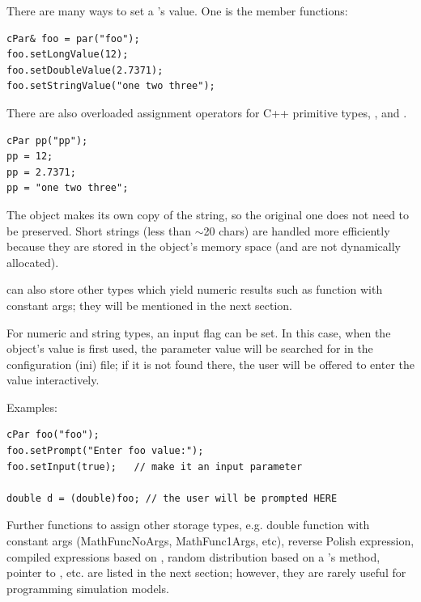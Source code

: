 There are many ways to set a 's value. One is the 
member functions:

\begin{verbatim}
cPar& foo = par("foo");
foo.setLongValue(12);
foo.setDoubleValue(2.7371);
foo.setStringValue("one two three");
\end{verbatim}

There are also overloaded assignment operators for C++ primitive types,
, and .

\begin{verbatim}
cPar pp("pp");
pp = 12;
pp = 2.7371;
pp = "one two three";
\end{verbatim}

The  object makes its own copy of the string, so the
original one does not need to be preserved. Short strings (less than
\ensuremath{\sim}20 chars) are handled more efficiently because they
are stored in the object's memory space (and are not dynamically
allocated).

 can also store other types which yield numeric
results such as function with constant args;
they will be mentioned in the next section.

For numeric and string types, an input flag can be
set. In this case, when the object's value is first used, the
parameter value will be searched for in the configuration (ini)
file; if it is not found there, the user will be offered
to enter the value interactively.

Examples:

\begin{verbatim}
cPar foo("foo");
foo.setPrompt("Enter foo value:");
foo.setInput(true);   // make it an input parameter

double d = (double)foo; // the user will be prompted HERE
\end{verbatim}

Further  functions to assign other storage types,
e.g. double function with constant args (MathFuncNoArgs, MathFunc1Args, etc),
reverse Polish expression, compiled expressions based on
, random distribution based on a
's  method, pointer to ,
etc. are listed in the next section; however, they are rarely useful
for programming simulation models.


%
%
%

